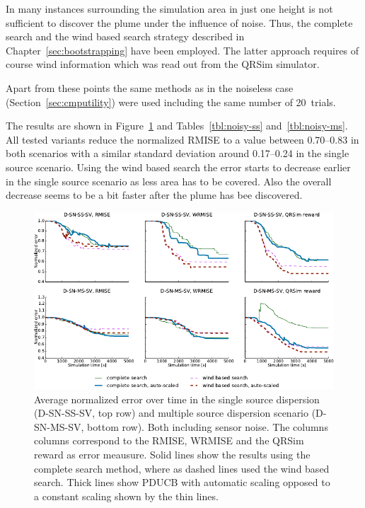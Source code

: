 In many instances surrounding the simulation area in just one height is not 
sufficient to discover the plume under the influence of noise. Thus, the 
complete search and the wind based search strategy described in 
Chapter~\ref{sec:bootstrapping} have been employed. The latter approach requires 
of course wind information which was read out from the QRSim simulator.

Apart from these points the same methods as in the noiseless case 
(Section~\ref{sec:cmputility}) were used including the same number of 20~trials.

The results are shown in Figure~\ref{fig:noisy-ss} and Tables~\ref{tbl:noisy-ss} 
and~\ref{tbl:noisy-ms}. All tested variants reduce the normalized RMISE to 
a value between \numrange{0.70}{0.83} in both scenarios with a similar standard 
deviation around \numrange{0.17}{0.24} in the single source scenario.  Using the 
wind based search the error starts to decrease earlier in the single source 
scenario as less area has to be covered.  Also the overall decrease seems to be 
a bit faster after the plume has bee discovered.

\begin{figure}
    \centering
    \includegraphics{plots/noisy-sv}
    \caption[Normalized error in scenarios with sensor noise]{Average normalized 
        error over time in the single source dispersion (D-SN-SS-SV, top row) 
        and multiple source dispersion scenario (D-SN-MS-SV, bottom row). Both 
        including sensor noise.  The columns columns correspond to the RMISE, 
        WRMISE and the QRSim reward as error meausure. Solid lines show the 
        results using the complete search method, where as dashed lines used the 
        wind based search.  Thick lines show PDUCB with automatic scaling 
        opposed to a constant scaling shown by the thin 
        lines.}\label{fig:noisy-ss}
\end{figure}

